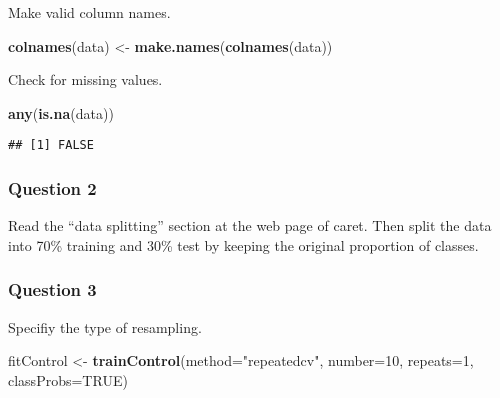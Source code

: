 \documentclass[]{article}
\newenvironment{Shaded}{\begin{snugshade}}{\end{snugshade}}
\newcommand{\DataTypeTok}[1]{\textcolor[rgb]{0.13,0.29,0.53}{#1}}
\newcommand{\DecValTok}[1]{\textcolor[rgb]{0.00,0.00,0.81}{#1}}
\newcommand{\KeywordTok}[1]{\textcolor[rgb]{0.13,0.29,0.53}{\textbf{#1}}}
\newcommand{\NormalTok}[1]{#1}
\newcommand{\OperatorTok}[1]{\textcolor[rgb]{0.81,0.36,0.00}{\textbf{#1}}}
\newcommand{\OtherTok}[1]{\textcolor[rgb]{0.56,0.35,0.01}{#1}}
\newcommand{\StringTok}[1]{\textcolor[rgb]{0.31,0.60,0.02}{#1}}
\begin{document}
Make valid column names.

\begin{Shaded}
\begin{Highlighting}[]
\KeywordTok{colnames}\NormalTok{(data) <-}\StringTok{ }\KeywordTok{make.names}\NormalTok{(}\KeywordTok{colnames}\NormalTok{(data))}
\end{Highlighting}
\end{Shaded}

Check for missing values.

\begin{Shaded}
\begin{Highlighting}[]
\KeywordTok{any}\NormalTok{(}\KeywordTok{is.na}\NormalTok{(data))}
\end{Highlighting}
\end{Shaded}

\begin{verbatim}
## [1] FALSE
\end{verbatim}

\hypertarget{question-2}{%
\subsubsection{Question 2}\label{question-2}}

Read the ``data splitting'' section at the web page of caret. Then split
the data into 70\% training and 30\% test by keeping the original
proportion of classes.

\begin{Shaded}
\end{Shaded}

\hypertarget{question-3}{%
\subsubsection{Question 3}\label{question-3}}

Specifiy the type of resampling.

\begin{Shaded}
\begin{Highlighting}[]
\NormalTok{fitControl <-}\StringTok{ }\KeywordTok{trainControl}\NormalTok{(}\DataTypeTok{method=}\StringTok{"repeatedcv"}\NormalTok{, }
                           \DataTypeTok{number=}\DecValTok{10}\NormalTok{, }
                           \DataTypeTok{repeats=}\DecValTok{1}\NormalTok{,}
                           \DataTypeTok{classProbs=}\OtherTok{TRUE}\NormalTok{)}
\end{Highlighting}
\end{Shaded}
\end{document}
